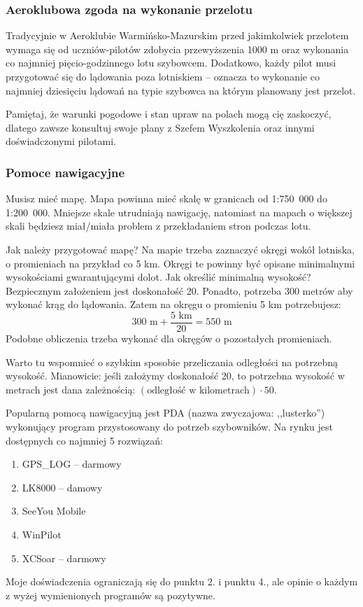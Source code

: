 \documentclass{article}
\begin{document}
\subsubsection{Aeroklubowa zgoda na wykonanie przelotu}
Tradycyjnie w Aeroklubie Warmińsko-Mazurskim przed jakimkolwiek przelotem
wymaga się od uczniów-pilotów zdobycia przewyższenia 1000 m oraz wykonania
co najmniej pięcio-godzinnego lotu szybowcem. Dodatkowo, każdy pilot musi
przygotować się do lądowania poza lotniskiem -- oznacza to wykonanie co
najmniej dziesięciu lądowań na typie szybowca na którym planowany jest
przelot.

Pamiętaj, że warunki pogodowe i stan upraw na polach mogą cię zaskoczyć,
dlatego zawsze konsultuj swoje plany z Szefem Wyszkolenia oraz innymi
doświadczonymi pilotami.

\subsubsection{Pomoce nawigacyjne}
Musisz mieć mapę. Mapa powinna mieć skalę
w granicach od 1:750~000 do 1:200~000. Mniejsze skale utrudniają
nawigację, natomiast na mapach o większej skali będziesz miał/miała
problem z przekładaniem stron podczas lotu.

Jak należy przygotować mapę? Na mapie trzeba zaznaczyć okręgi
wokół lotniska, o promieniach
na przykład co 5 km. Okręgi te powinny być opisane minimalnymi
wysokościami gwarantującymi dolot. Jak określić minimalną wysokość?
Bezpiecznym założeniem jest doskonałość 20. Ponadto, potrzeba 300 metrów
aby wykonać krąg do lądowania. Zatem na okręgu o promieniu 5 km potrzebujesz:
\begin{equation*}
300\textrm{ m}+\frac{5\textrm{ km}}{20} = 550 \textrm{ m}
\end{equation*}
\noindent
Podobne obliczenia trzeba wykonać dla okręgów o pozostałych promieniach.

Warto tu wspomnieć o szybkim sposobie przeliczania odległości na potrzebną
wysokość. Mianowicie: jeśli założymy doskonałość 20, to potrzebna wysokość
w metrach jest dana zależnością:
$(\textrm{odległość w kilometrach}) \cdot 50$.

Popularną pomocą nawigacyjną jest PDA (nazwa zwyczajowa: ,,lusterko'') 
wykonujący program przystosowany
do potrzeb szybowników. Na rynku jest dostępnych co najmniej 5
rozwiązań:
\begin{enumerate}
\item GPS\_LOG -- darmowy
\item LK8000 -- damowy
\item SeeYou Mobile
\item WinPilot
\item XCSoar -- darmowy
\end{enumerate}
Moje doświadczenia ograniczają się do punktu 2. i punktu 4., ale
opinie o każdym z wyżej wymienionych programów są pozytywne.
\end{document}
